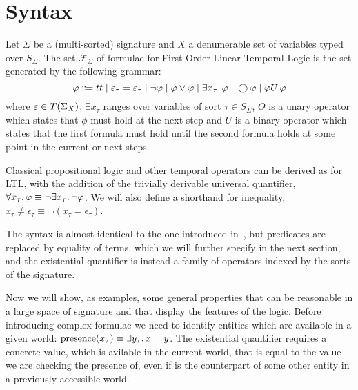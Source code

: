 \section{Syntax}

\begin{definition}
Let $\Sigma$ be a (multi-sorted) signature and $X$ a denumerable set of variables typed over $S_\Sigma$. The set
$\mathcal{F}_\Sigma$ of formulae for First-Order Linear Temporal Logic is the set generated by the following grammar:
\[
  \varphi \Coloneqq tt \;|\; \varepsilon_\tau = \varepsilon_\tau
                    \;|\; \neg\varphi
                    \;|\; \varphi \lor \varphi
                    \;|\; \exists {x_\tau} \ldotp {\varphi}
                    \;|\; \bigcirc{\varphi}
                    \;|\; {\varphi}U\,{\varphi}
\]
where $\varepsilon \in T({\Sigma}_{X})$, $\exists x_\tau$ ranges over variables of sort $\tau \in S_\Sigma$,
$O$ is a unary operator which states that $\phi$ must hold at the next step and $U$ is a binary operator which states
that the first formula must hold until the second formula holds at some point in the current or next steps.
\end{definition}

Classical propositional logic and other temporal operators can be derived as for LTL, with the addition of the trivially
derivable universal quantifier, $\forall {x_\tau} \ldotp {\varphi} \equiv \neg\exists {x_\tau} \ldotp {\neg\varphi}$. We will also define a
shorthand for inequality, $x_\tau \neq \epsilon_\tau \equiv \neg(x_\tau = \epsilon_\tau)$.

The syntax is almost identical to the one introduced in~, but predicates are replaced by
equality of terms, which we will further specify in the next section, and the existential quantifier is instead a family
of operators indexed by the sorts of the signature.

Now we will show, as examples, some general properties that can be reasonable in a large space of signature and that
display the features of the logic. Before introducing complex formulae we need to identify entities which are available
in a given world: $\text{presence}(x_\tau) \equiv \exists {y_\tau} \ldotp {x = y}$. The existential quantifier requires a
concrete value, which is avilable in the current world, that is equal to the value we are checking the presence of, even
if is the counterpart of some other entity in a previously accessible world.

